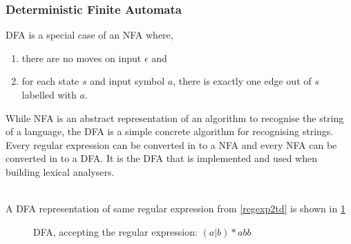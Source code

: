 \subsubsection{Deterministic Finite Automata}
DFA is a special case of an NFA where,
\begin{enumerate}
  \item there are no moves on input $\epsilon$ and
  \item for each state $s$ and input symbol $a$, there is exactly one edge out
        of $s$ labelled with $a$.
\end{enumerate}
While NFA is an abstract representation of an algorithm to recognise the string 
of a language, the DFA is a simple concrete algorithm for recognising strings. 
Every regular expression can be converted in to a NFA and every NFA can be 
converted in to a DFA. \cite{Aho2006} It is the DFA that is implemented and 
used when building lexical analysers. 
\begin{example} \label{regexp2dfa}
\cite{Aho2006}\\
A DFA representation of same regular expression from \cref{regexp2td} is shown in \cref{fig:dfa}
\end{example}
\begin{figure}[!h]
  \centering
  \caption{DFA, accepting the regular expression: $(a | b)* abb$
  \label{fig:dfa}}
\end{figure}

 
